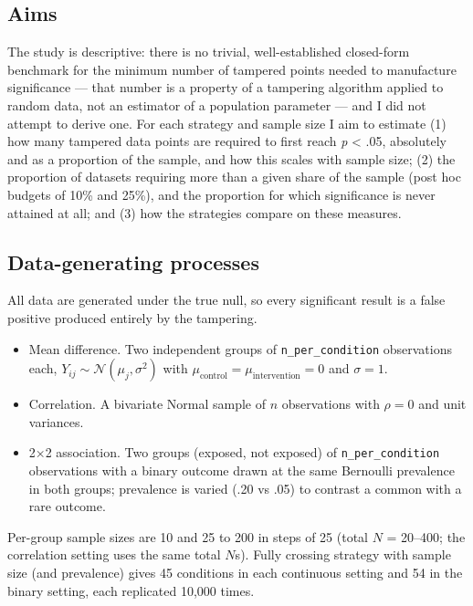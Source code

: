 \documentclass[
  nonatbib,
  authoryear,
  preprint]{elsarticle}
\providecommand{\tightlist}{%
  \setlength{\itemsep}{0pt}\setlength{\parskip}{0pt}}
\begin{document}
\subsection{Aims}\label{aims}

The study is descriptive: there is no trivial, well-established
closed-form benchmark for the minimum number of tampered points needed
to manufacture significance --- that number is a property of a tampering
algorithm applied to random data, not an estimator of a population
parameter --- and I did not attempt to derive one. For each strategy and
sample size I aim to estimate (1) how many tampered data points are
required to first reach \emph{p} \textless{} .05, absolutely and as a
proportion of the sample, and how this scales with sample size; (2) the
proportion of datasets requiring more than a given share of the sample
(post hoc budgets of 10\% and 25\%), and the proportion for which
significance is never attained at all; and (3) how the strategies
compare on these measures.

\subsection{Data-generating processes}\label{data-generating-processes}

All data are generated under the true null, so every significant result
is a false positive produced entirely by the tampering.

\begin{itemize}
\tightlist
\item
  Mean difference. Two independent groups of \texttt{n\_per\_condition}
  observations each, \(Y_{ij} \sim \mathcal{N}(\mu_j, \sigma^2)\) with
  \(\mu_{\text{control}} = \mu_{\text{intervention}} = 0\) and
  \(\sigma = 1\).
\item
  Correlation. A bivariate Normal sample of \(n\) observations with
  \(\rho = 0\) and unit variances.
\item
  2×2 association. Two groups (exposed, not exposed) of
  \texttt{n\_per\_condition} observations with a binary outcome drawn at
  the same Bernoulli prevalence in both groups; prevalence is varied
  (.20 vs .05) to contrast a common with a rare outcome.
\end{itemize}

Per-group sample sizes are 10 and 25 to 200 in steps of 25 (total \(N\)
= 20--400; the correlation setting uses the same total \(N\)s). Fully
crossing strategy with sample size (and prevalence) gives 45 conditions
in each continuous setting and 54 in the binary setting, each replicated
10,000 times.
\end{document}
